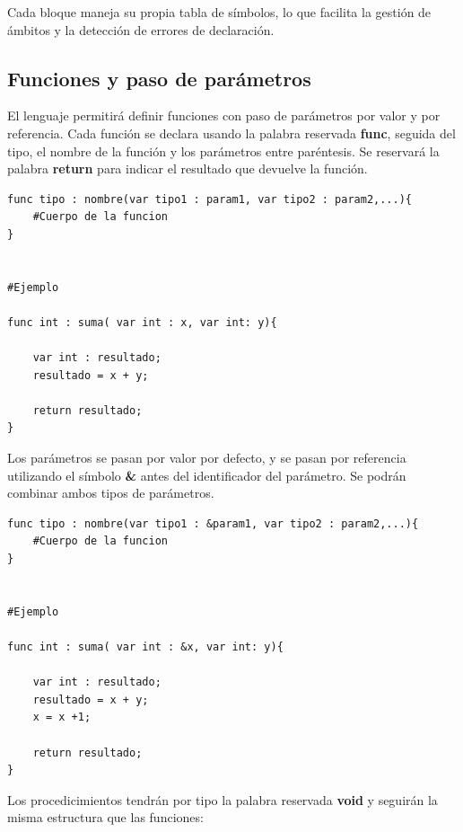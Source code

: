 \documentclass[12pt,a4paper]{article}
\begin{document}
Cada bloque maneja su propia tabla de símbolos, lo que facilita la gestión de ámbitos y la detección de errores de declaración.



\subsection{Funciones y paso de parámetros}

El lenguaje permitirá definir funciones con paso de parámetros por valor y por referencia.  
Cada función se declara usando la palabra reservada \textbf{func}, seguida del tipo, el nombre de la función y los parámetros entre paréntesis. Se reservará la palabra \textbf{return} para indicar el resultado que devuelve la función.

\begin{lstlisting}
func tipo : nombre(var tipo1 : param1, var tipo2 : param2,...){
    #Cuerpo de la funcion
}


#Ejemplo

func int : suma( var int : x, var int: y){

    var int : resultado;
    resultado = x + y;

    return resultado;
}
\end{lstlisting}



Los parámetros se pasan por valor por defecto, y se pasan por referencia utilizando el símbolo \textbf{\&} antes del identificador del parámetro. Se podrán combinar ambos tipos de parámetros.



\begin{lstlisting}
func tipo : nombre(var tipo1 : &param1, var tipo2 : param2,...){
    #Cuerpo de la funcion
}


#Ejemplo

func int : suma( var int : &x, var int: y){

    var int : resultado;
    resultado = x + y;
    x = x +1;

    return resultado;
}
\end{lstlisting}

Los procedicimientos tendrán por tipo la palabra reservada \textbf{void} y seguirán la misma estructura que las funciones:
\end{document}

